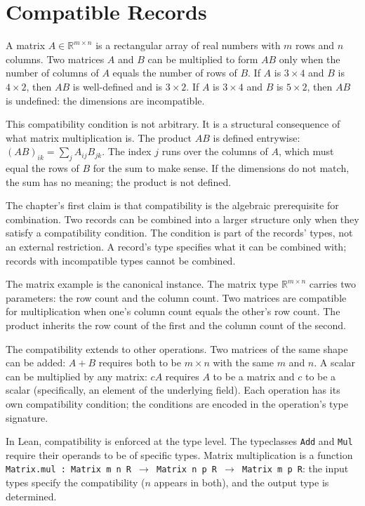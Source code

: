 \section{Compatible Records}
\label{se:compatible-records}

A matrix $A \in \mathbb{R}^{m \times n}$ is a rectangular array of real
numbers with $m$ rows and $n$ columns. Two matrices $A$ and $B$ can be
multiplied to form $AB$ only when the number of columns of $A$ equals
the number of rows of $B$. If $A$ is $3 \times 4$ and $B$ is $4 \times
2$, then $AB$ is well-defined and is $3 \times 2$. If $A$ is $3
\times 4$ and $B$ is $5 \times 2$, then $AB$ is undefined: the
dimensions are incompatible.

This compatibility condition is not arbitrary. It is a structural
consequence of what matrix multiplication is. The product $AB$ is
defined entrywise: $(AB)_{ik} = \sum_j A_{ij} B_{jk}$. The index $j$
runs over the columns of $A$, which must equal the rows of $B$ for
the sum to make sense. If the dimensions do not match, the sum has
no meaning; the product is not defined.

The chapter's first claim is that compatibility is the algebraic
prerequisite for combination. Two records can be combined into a
larger structure only when they satisfy a compatibility condition.
The condition is part of the records' types, not an external
restriction. A record's type specifies what it can be combined with;
records with incompatible types cannot be combined.

The matrix example is the canonical instance. The matrix type
$\mathbb{R}^{m \times n}$ carries two parameters: the row count and
the column count. Two matrices are compatible for multiplication
when one's column count equals the other's row count. The product
inherits the row count of the first and the column count of the
second.

The compatibility extends to other operations. Two matrices of the
same shape can be added: $A + B$ requires both to be $m \times n$
with the same $m$ and $n$. A scalar can be multiplied by any
matrix: $cA$ requires $A$ to be a matrix and $c$ to be a scalar
(specifically, an element of the underlying field). Each operation
has its own compatibility condition; the conditions are encoded in
the operation's type signature.

In Lean, compatibility is enforced at the type level. The
typeclasses \texttt{Add} and \texttt{Mul} require their operands
to be of specific types. Matrix multiplication is a function
\texttt{Matrix.mul : Matrix m n R $\to$ Matrix n p R $\to$ Matrix
m p R}: the input types specify the compatibility ($n$ appears in
both), and the output type is determined.

